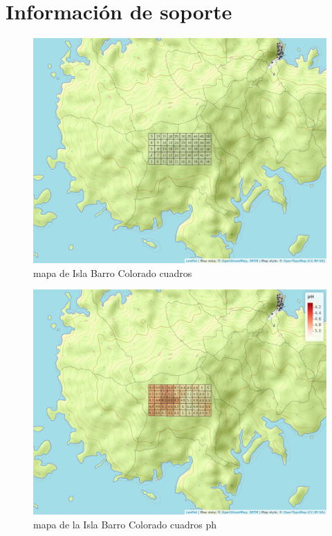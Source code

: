 \documentclass[11pt,]{article}
\begin{document}
\section{Información de soporte}\label{informaciuxf3n-de-soporte}

\begin{figure}
\centering
\includegraphics[width=1.00000\textwidth]{mapa_cuadros.png}
\caption{mapa de Isla Barro Colorado cuadros\label{fig:bci_map}}
\end{figure}

\begin{figure}
\centering
\includegraphics[width=1.00000\textwidth]{mapa_cuadros_ph.png}
\caption{mapa de la Isla Barro Colorado cuadros ph\label{fig:bci_map}}
\end{figure}
\end{document}
